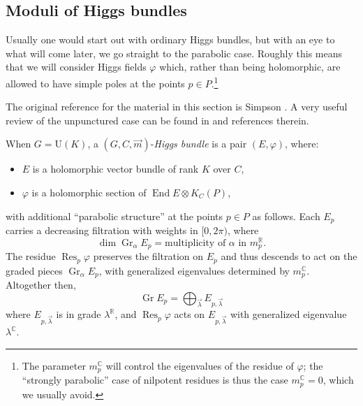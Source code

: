 \documentclass[12pt,letterpaper,reqno]{article}
\numberwithin{equation}{section}
\newcommand{\R}{\ensuremath{\mathbb R}}
\newcommand{\C}{\ensuremath{\mathbb C}}
\newcommand{\ti}[1]{\textit{#1}}
\DeclareMathOperator{\End}{End}
\DeclareMathOperator{\Res}{Res}
\DeclareMathOperator{\Gr}{Gr}
\newcommand{\U}{\mathrm{U}}
\newcommand{\fixme}[1]{{\color{orange}{[#1]}}}
\begin{document}

\subsection{Moduli of Higgs bundles}

Usually one would start out with ordinary Higgs bundles,
but with an eye to what will come later, we go straight
to the parabolic case. Roughly this means that we will consider
Higgs fields $\varphi$ which, rather than being holomorphic, are
allowed to have simple poles at the points $p \in P$.\footnote{The parameter $m_p^\C$ will
control the eigenvalues of the residue of $\varphi$; the
``strongly parabolic'' case of nilpotent residues
is thus the case $m_p^\C = 0$, which we usually
avoid.}

The original reference for the material in this section
is Simpson \cite{hbnc}.
A very useful review of the unpunctured case can be found in
\cite{Wentworth2014} and references therein.

\begin{defn}[Parabolic Higgs bundles for $G = \U(K)$] \label{def:parabolic-higgs}
When $G = \U(K)$, a $(G, C, \vec m)$-\ti{Higgs bundle} is a pair $(E, \varphi)$, where:
\begin{itemize}
  \item $E$ is a holomorphic vector bundle of rank $K$ over $C$,
  \item $\varphi$ is a holomorphic section of $\End E \otimes K_C(P)$,
\end{itemize}
with additional ``parabolic structure'' at the points $p \in P$
as follows. Each $E_p$ carries a decreasing filtration with weights in $[0,2\pi)$, where 
\begin{equation}
  \dim \Gr_\alpha E_p = \text{multiplicity of $\alpha$ in $m_p^\R$}.
\end{equation}
The residue $\Res_p \varphi$
preserves the filtration on $E_p$ and thus descends to
act on the graded pieces $\Gr_\alpha E_p$, with generalized
eigenvalues determined by $m_p^\C$. Altogether then,
\begin{equation}
 \Gr E_p = \bigoplus_{\vec{\lambda}} E_{p,\vec\lambda}
\end{equation}
where $E_{p,\vec\lambda}$ is in grade $\lambda^\R$, and 
$\Res_p \varphi$ acts on $E_{p,\vec\lambda}$
with generalized eigenvalue $\lambda^\C$.
\end{defn}
\end{document}
